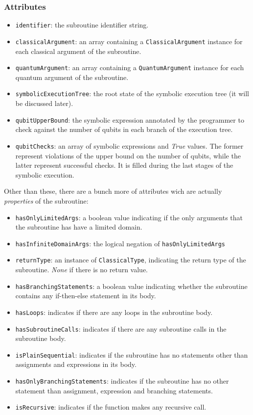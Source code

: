 \documentclass[12pt,a4paper]{report}
\theoremstyle{definition}
\theoremstyle{definition}
\theoremstyle{definition}
\begin{document}
\subsubsection{Attributes}
\begin{itemize}
    \itemsep 0em
    \item \texttt{identifier}: the subroutine identifier string.
    \item \texttt{classicalArgument}: an array containing a \texttt{ClassicalArgument} instance for each classical argument of the subroutine.
    \item \texttt{quantumArgument}: an array containing a \texttt{QuantumArgument} instance for each quantum argument of the subroutine.
    \item \texttt{symbolicExecutionTree}: the root state of the symbolic execution tree (it will be discussed later).
    \item \texttt{qubitUpperBound}: the symbolic expression annotated by the programmer to check against the number of qubits in each branch of the execution tree.
    \item \texttt{qubitChecks}: an array of symbolic expressions and \textit{True} values. The former represent violations of the upper bound on the number of qubits, while the latter represent successful checks. It is filled during the last stages of the symbolic execution.
\end{itemize}
Other than these, there are a bunch more of attributes wich are actually \textit{properties} of the subroutine:
\begin{itemize}
    \itemsep 0em
    \item \texttt{hasOnlyLimitedArgs}: a boolean value indicating if the only arguments that the subroutine has have a limited domain.
    \item \texttt{hasInfiniteDomainArgs}: the logical negation of \texttt{hasOnlyLimitedArgs}
    \item \texttt{returnType}: an instance of \texttt{ClassicalType}, indicating the return type of the subroutine. \textit{None} if there is no return value.
    \item \texttt{hasBranchingStatements}: a boolean value indicating whether the subroutine contains any if-then-else statement in its body.
    \item \texttt{hasLoops}: indicates if there are any loops in the subroutine body.
    \item \texttt{hasSubroutineCalls}: indicates if there are any subroutine calls in the subroutine body.
    \item \texttt{isPlainSequential}: indicates if the subroutine has no statements other than assignments and expressions in its body.
    \item \texttt{hasOnlyBranchingStatements}: indicates if the subroutine has no other statement than assignment, expression and branching statements.
    \item \texttt{isRecursive}: indicates if the function makes any recursive call.
\end{itemize}
\end{document}
